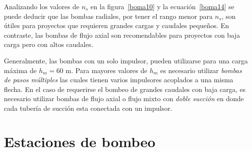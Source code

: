 \documentclass[11pt, oneside]{article}
\begin{document}
Analizando los valores de $n_s$ en la figura~\ref{boma10} y la ecuaci\'on~\ref{boma14} se puede deducir  que las bombas radiales, por tener el rango menor para $n_s$, son \'utiles para proyectos que requieren grandes cargas y caudales peque\~nos. En contraste, las bombas de flujo axial son recomendables para proyectos con baja carga pero con altos caudales.  

Generalmente, las bombas con un solo impulsor, pueden utilizarse para una carga m\'axima de $h_m = 60$ m. Para mayores valores de $h_m$ es necesario utilizar \emph{bombas de pasos m\'ultiples} las cuales tienen varios impulsores acoplados a una misma flecha. En el caso de requerirse el bombeo de grandes caudales con baja carga, es necesario utilizar bombas de flujo axial o flujo mixto con \emph{doble succi\'on} en donde cada tuber\'ia de succi\'on esta conectada con un impulsor. 

\section{Estaciones de bombeo}
\end{document}
